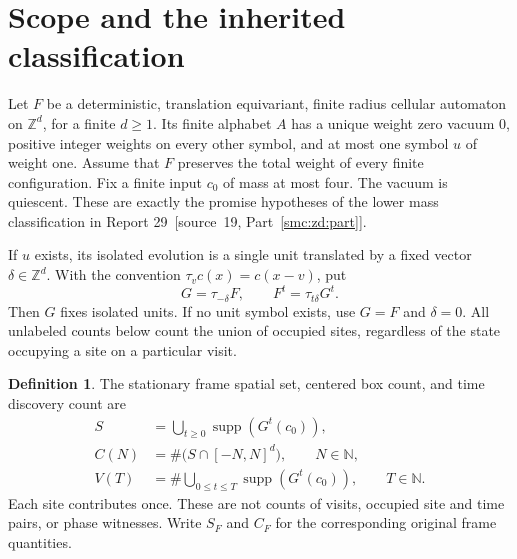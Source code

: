\documentclass[11pt,letterpaper]{article}
\numberwithin{equation}{section}
\theoremstyle{definition}
\newtheorem{definition}[theorem]{Definition}
\theoremstyle{remark}
\newcommand{\Z}{\mathbb Z}
\newcommand{\NN}{\mathbb N}
\newcommand{\supp}{\operatorname{supp}}
\begin{document}
\section{Scope and the inherited classification}\label{smc:og:sec:scope}
Let $F$ be a deterministic, translation equivariant, finite radius cellular automaton on $\Z^d$, for a finite $d\ge1$. Its finite alphabet $A$ has a unique weight zero vacuum $0$, positive integer weights on every other symbol, and at most one symbol $u$ of weight one. Assume that $F$ preserves the total weight of every finite configuration. Fix a finite input $c_0$ of mass at most four. The vacuum is quiescent. These are exactly the promise hypotheses of the lower mass classification in Report 29~\textup{[source~19, Part~\ref{smc:zd:part}]}.

If $u$ exists, its isolated evolution is a single unit translated by a fixed vector $\delta\in\Z^d$. With the convention $\tau_v c(x)=c(x-v)$, put
\begin{equation}\label{smc:og:eq:normalization}
 G=\tau_{-\delta}F,\qquad F^t=\tau_{t\delta}G^t.
\end{equation}
Then $G$ fixes isolated units. If no unit symbol exists, use $G=F$ and $\delta=0$. All unlabeled counts below count the union of occupied sites, regardless of the state occupying a site on a particular visit.

\begin{definition}
The stationary frame spatial set, centered box count, and time discovery count are
\begin{align*}
 S&=\bigcup_{t\ge0}\supp(G^t(c_0)),\\
 C(N)&=\#\bigl(S\cap[-N,N]^d\bigr),\qquad N\in\NN,\\
 V(T)&=\#\bigcup_{0\le t\le T}\supp(G^t(c_0)),\qquad T\in\NN.
\end{align*}
Each site contributes once. These are not counts of visits, occupied site and time pairs, or phase witnesses. Write $S_F$ and $C_F$ for the corresponding original frame quantities.
\end{definition}
\end{document}
